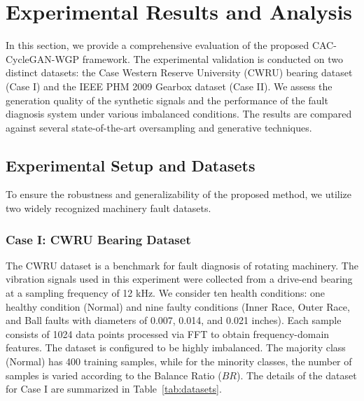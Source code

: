 \section{Experimental Results and Analysis}
\label{sec:experiments}

In this section, we provide a comprehensive evaluation of the proposed CAC-CycleGAN-WGP framework. The experimental validation is conducted on two distinct datasets: the Case Western Reserve University (CWRU) bearing dataset (Case I) and the IEEE PHM 2009 Gearbox dataset (Case II). We assess the generation quality of the synthetic signals and the performance of the fault diagnosis system under various imbalanced conditions. The results are compared against several state-of-the-art oversampling and generative techniques.

\subsection{Experimental Setup and Datasets}
To ensure the robustness and generalizability of the proposed method, we utilize two widely recognized machinery fault datasets.

\subsubsection{Case I: CWRU Bearing Dataset}
The CWRU dataset is a benchmark for fault diagnosis of rotating machinery. The vibration signals used in this experiment were collected from a drive-end bearing at a sampling frequency of 12 kHz. We consider ten health conditions: one healthy condition (Normal) and nine faulty conditions (Inner Race, Outer Race, and Ball faults with diameters of 0.007, 0.014, and 0.021 inches). Each sample consists of 1024 data points processed via FFT to obtain frequency-domain features. The dataset is configured to be highly imbalanced. The majority class (Normal) has 400 training samples, while for the minority classes, the number of samples is varied according to the Balance Ratio ($BR$). The details of the dataset for Case I are summarized in Table~\ref{tab:datasets}.

